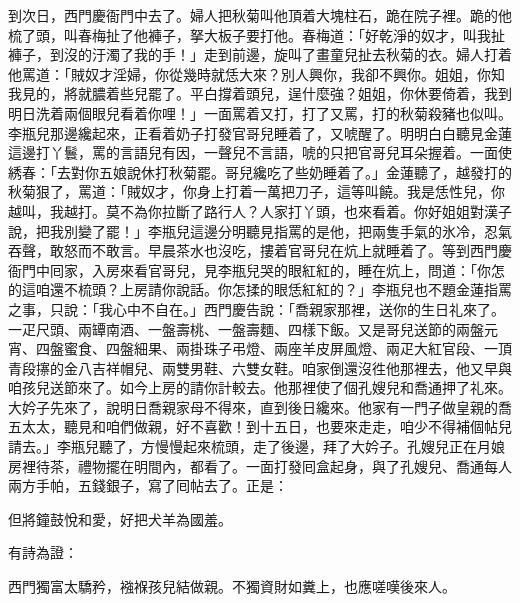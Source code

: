 到次日，西門慶衙門中去了。婦人把秋菊叫他頂着大塊柱石，跪在院子裡。跪的他梳了頭，叫春梅扯了他褲子，拏大板子要打他。春梅道：「好乾淨的奴才，叫我扯褲子，到沒的汙濁了我的手！」走到前邊，旋叫了畫童兒扯去秋菊的衣。婦人打着他罵道：「賊奴才淫婦，你從幾時就恁大來？別人興你，我卻不興你。姐姐，你知我見的，將就膿着些兒罷了。平白撐着頭兒，逞什麼強？姐姐，你休要倚着，我到明日洗着兩個眼兒看着你哩！」{}一面罵着又打，打了又罵，打的秋菊殺豬也似叫。李瓶兒那邊纔起來，正看着奶子打發官哥兒睡着了，又唬醒了。明明白白聽見金蓮這邊打丫鬟，罵的言語兒有因，一聲兒不言語，唬的只把官哥兒耳朵握着。一面使綉春：「去對你五娘說休打秋菊罷。哥兒纔吃了些奶睡着了。」金蓮聽了，越發打的秋菊狠了，罵道：「賊奴才，你身上打着一萬把刀子，這等叫饒。我是恁性兒，你越叫，我越打。{}莫不為你拉斷了路行人？人家打丫頭，也來看着。你好姐姐對漢子說，把我別變了罷！」李瓶兒這邊分明聽見指罵的是他，把兩隻手氣的氷冷，忍氣吞聲，敢怒而不敢言。早晨茶水也沒吃，摟着官哥兒在炕上就睡着了。等到西門慶衙門中囘家，入房來看官哥兒，見李瓶兒哭的眼紅紅的，睡在炕上，問道：「你怎的這咱還不梳頭？上房請你說話。你怎揉的眼恁紅紅的？」李瓶兒也不題金蓮指罵之事，只說：「我心中不自在。」西門慶告說：「喬親家那裡，送你的生日礼來了。一疋尺頭、兩罈南酒、一盤壽桃、一盤壽麵、四樣下飯。又是哥兒送節的兩盤元宵、四盤蜜食、四盤細果、兩掛珠子弔燈、兩座羊皮屏風燈、兩疋大紅官段、一頂青段㩟的金八吉祥帽兒、兩雙男鞋、六雙女鞋。咱家倒還沒徃他那裡去，他又早與咱孩兒送節來了。如今上房的請你計較去。他那裡使了個孔嫂兒和喬通押了礼來。大妗子先來了，說明日喬親家母不得來，直到後日纔來。他家有一門子做皇親的喬五太太，聽見和咱們做親，好不喜歡！到十五日，也要來走走，咱少不得補個帖兒請去。」李瓶兒聽了，方慢慢起來梳頭，走了後邊，拜了大妗子。孔嫂兒正在月娘房裡待茶，禮物擺在明間內，都看了。一面打發囘盒起身，與了孔嫂兒、喬通每人兩方手帕，五錢銀子，寫了囘帖去了。正是：

但將鐘鼓悅和愛，好把犬羊為國羞。

有詩為證：

西門獨富太驕矜，襁褓孩兒結做親。不獨資財如糞上，也應嗟嘆後來人。

